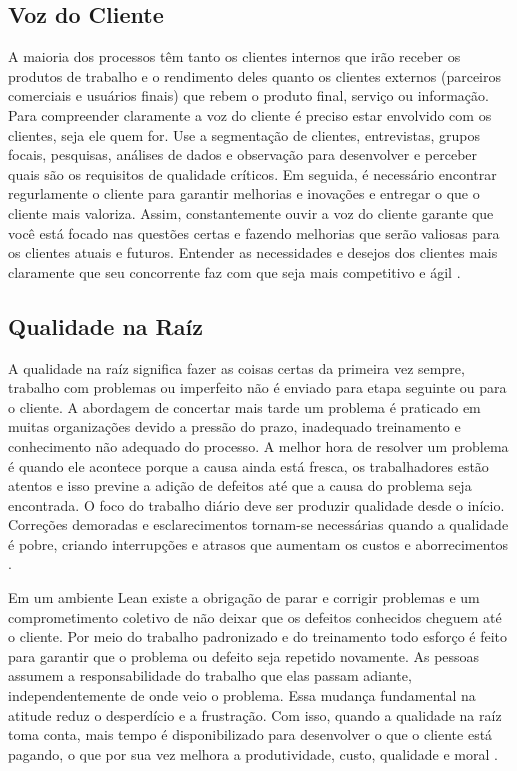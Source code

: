 \begin{anexosenv}
\subsection[Voz do Cliente]{Voz do Cliente}

A maioria dos processos têm tanto os clientes internos que irão receber os produtos de trabalho e o rendimento deles quanto os clientes externos (parceiros comerciais e usuários finais) que rebem o produto final, serviço ou informação. Para compreender claramente a voz do cliente é preciso estar envolvido com os clientes, seja ele quem for. Use a segmentação de clientes, entrevistas, grupos focais, pesquisas, análises de dados e observação para desenvolver e perceber quais são os requisitos de qualidade críticos. Em seguida, é necessário encontrar regurlamente o cliente para garantir melhorias e inovações e entregar o que o cliente mais valoriza. Assim, constantemente ouvir a voz do cliente garante que você está focado nas questões certas e fazendo melhorias que serão valiosas para os clientes atuais e futuros. Entender as necessidades e desejos dos clientes mais claramente que seu concorrente faz com que seja mais competitivo e ágil \cite{bell2011}.

\subsection[Qualidade na Raíz]{Qualidade na Raíz}

A qualidade na raíz significa fazer as coisas certas da primeira vez sempre, trabalho com problemas ou imperfeito não é enviado para etapa seguinte ou para o cliente. A abordagem de concertar mais tarde um problema é praticado em muitas organizações devido a pressão do prazo, inadequado treinamento e conhecimento não adequado do processo.  A melhor hora de resolver um problema é quando ele acontece porque a causa ainda está fresca, os trabalhadores estão atentos e isso previne a adição de defeitos até que a causa do problema seja encontrada.  O foco do trabalho diário deve ser produzir qualidade desde o início. Correções demoradas e esclarecimentos tornam-se necessárias quando a qualidade é pobre, criando interrupções e atrasos que aumentam os custos e aborrecimentos \cite{bell2011}.

Em um ambiente Lean existe a obrigação de parar e corrigir problemas e um comprometimento coletivo de não deixar que os defeitos conhecidos cheguem até o cliente. Por meio do trabalho padronizado e do treinamento todo esforço é feito para garantir que o problema ou defeito seja repetido novamente. As pessoas assumem a responsabilidade do trabalho que elas passam adiante, independentemente de onde veio o problema. Essa mudança fundamental na atitude reduz o desperdício e a frustração. Com isso, quando a qualidade na raíz toma conta, mais tempo é disponibilizado para desenvolver o que o cliente está pagando, o que por sua vez melhora a produtividade, custo, qualidade e moral \cite{bell2011}.


\end{anexosenv}
